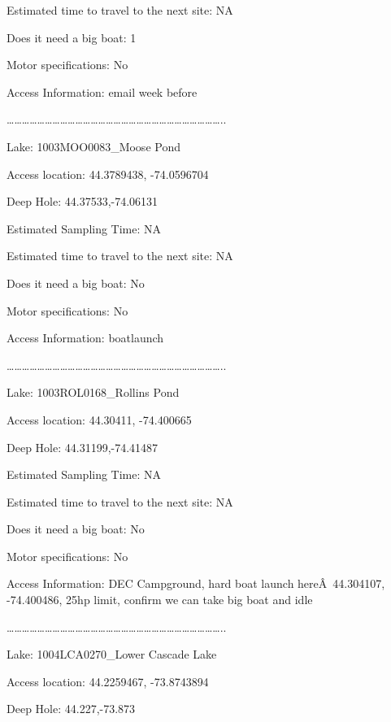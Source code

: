 \documentclass[]{article}
\begin{document}
Estimated time to travel to the next site: NA

Does it need a big boat: 1

Motor specifications: No

Access Information: email week before

\ldots{}\ldots{}\ldots{}\ldots{}\ldots{}\ldots{}\ldots{}\ldots{}\ldots{}\ldots{}\ldots{}\ldots{}\ldots{}\ldots{}\ldots{}\ldots{}\ldots{}\ldots{}\ldots{}\ldots{}\ldots{}\ldots{}\ldots{}\ldots{}\ldots{}\ldots{}\ldots{}\ldots{}..

Lake: 1003MOO0083\_Moose Pond

Access location: 44.3789438, -74.0596704

Deep Hole: 44.37533,-74.06131

Estimated Sampling Time: NA

Estimated time to travel to the next site: NA

Does it need a big boat: No

Motor specifications: No

Access Information: boatlaunch

\ldots{}\ldots{}\ldots{}\ldots{}\ldots{}\ldots{}\ldots{}\ldots{}\ldots{}\ldots{}\ldots{}\ldots{}\ldots{}\ldots{}\ldots{}\ldots{}\ldots{}\ldots{}\ldots{}\ldots{}\ldots{}\ldots{}\ldots{}\ldots{}\ldots{}\ldots{}\ldots{}\ldots{}..

Lake: 1003ROL0168\_Rollins Pond

Access location: 44.30411, -74.400665

Deep Hole: 44.31199,-74.41487

Estimated Sampling Time: NA

Estimated time to travel to the next site: NA

Does it need a big boat: No

Motor specifications: No

Access Information: DEC Campground, hard boat launch hereÂ~44.304107,
-74.400486, 25hp limit, confirm we can take big boat and idle

\ldots{}\ldots{}\ldots{}\ldots{}\ldots{}\ldots{}\ldots{}\ldots{}\ldots{}\ldots{}\ldots{}\ldots{}\ldots{}\ldots{}\ldots{}\ldots{}\ldots{}\ldots{}\ldots{}\ldots{}\ldots{}\ldots{}\ldots{}\ldots{}\ldots{}\ldots{}\ldots{}\ldots{}..

Lake: 1004LCA0270\_Lower Cascade Lake

Access location: 44.2259467, -73.8743894

Deep Hole: 44.227,-73.873
\end{document}
